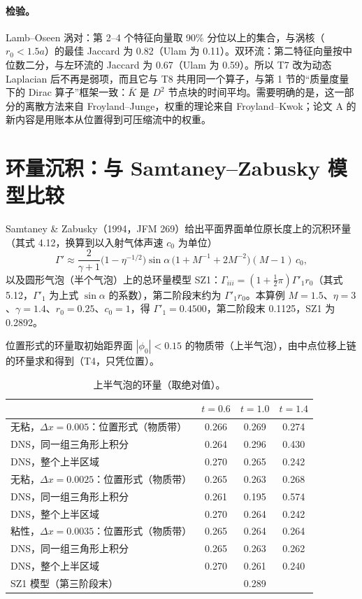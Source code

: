 \paragraph{检验。}Lamb–Oseen 涡对：第 2–4 个特征向量取 90\% 分位以上的集合，与涡核（$r_0<1.5a$）的最佳 Jaccard 为 0.82（Ulam 为 0.11）。双环流：第二特征向量按中位数二分，与左环流的 Jaccard 为 0.67（Ulam 为 0.59）。所以 T7 改为动态 Laplacian 后不再是弱项，而且它与 T8 共用同一个算子，与第 1 节的“质量度量下的 Dirac 算子”框架一致：$\bar K$ 是 $D^2$ 节点块的时间平均。需要明确的是，这一部分的离散方法来自 Froyland–Junge，权重的理论来自 Froyland–Kwok；论文 A 的新内容是用账本从位置得到可压缩流中的权重。
\section{环量沉积：与 Samtaney--Zabusky 模型比较}\label{pC:sec:sz}
Samtaney \& Zabusky（1994，JFM 269）给出平面界面单位原长度上的沉积环量（其式 4.12，换算到以入射气体声速 $c_0$ 为单位）
\begin{equation}
\Gamma'\approx\frac{2}{\gamma+1}\Big(1-\eta^{-1/2}\Big)\sin\alpha\,\big(1+M^{-1}+2M^{-2}\big)(M-1)\,c_0,
\end{equation}
以及圆形气泡（半个气泡）上的总环量模型 SZ1：$\Gamma_{iii}=(1+\tfrac12\pi)\Gamma'_1r_0$（其式 5.12，$\Gamma'_1$ 为上式 $\sin\alpha$ 的系数），第二阶段末约为 $\Gamma'_1r_0$。本算例 $M=1.5$、$\eta=3$、$\gamma=1.4$、$r_0=0.25$、$c_0=1$，得 $\Gamma'_1=0.4500$，第二阶段末 0.1125，SZ1 为 0.2892。

位置形式的环量取初始距界面 $|\phi_0|<0.15$ 的物质带（上半气泡），由中点位移上链的环量求和得到（T4，只凭位置）。
\begin{table}[!htbp]\centering\small\caption{上半气泡的环量（取绝对值）。}\begin{tabular}{lccc}\toprule & $t=0.6$ & $t=1.0$ & $t=1.4$\\\midrule
无粘，$\Delta x=0.005$：位置形式（物质带） & 0.266 & 0.269 & 0.274\\
\quad DNS，同一组三角形上积分 & 0.264 & 0.296 & 0.430\\
\quad DNS，整个上半区域 & 0.270 & 0.265 & 0.242\\
无粘，$\Delta x=0.0025$：位置形式（物质带） & 0.265 & 0.263 & 0.268\\
\quad DNS，同一组三角形上积分 & 0.261 & 0.195 & 0.574\\
\quad DNS，整个上半区域 & 0.270 & 0.264 & 0.242\\
粘性，$\Delta x=0.0035$：位置形式（物质带） & 0.265 & 0.264 & 0.264\\
\quad DNS，同一组三角形上积分 & 0.265 & 0.263 & 0.262\\
\quad DNS，整个上半区域 & 0.270 & 0.261 & 0.240\\
SZ1 模型（第三阶段末） & \multicolumn{3}{c}{0.289}\\\bottomrule\end{tabular}\end{table}
